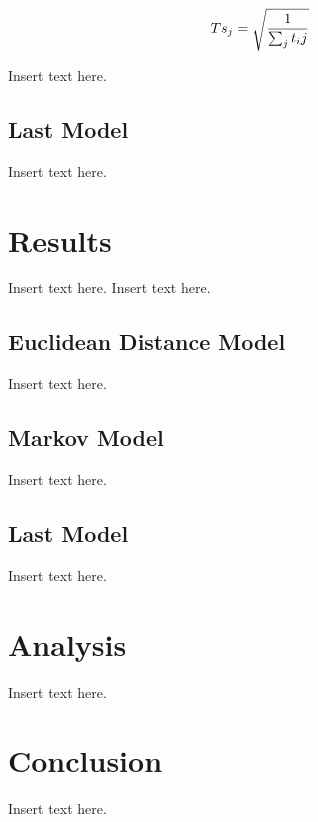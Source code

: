\documentclass[twoside,twocolumn]{article}
\begin{document}
\begin{equation}
\begin{aligned}
Ts_j = \sqrt{1\over{\sum_j{t_ij}}}
\end{aligned}
\end{equation}


Insert text here.
\subsection{Last Model} %
Insert text here.

\section{Results}
Insert text here.
\label{sec:res}
Insert text here.
\subsection{Euclidean Distance Model}
Insert text here.
\subsection{Markov Model}
Insert text here.
\subsection{Last Model}
Insert text here.

\section{Analysis}
\label{sec:analysis}
Insert text here.

\section{Conclusion}
\label{sec:conclusion}
Insert text here.

\end{document}
